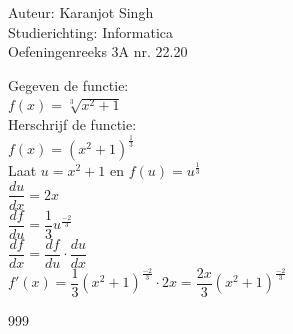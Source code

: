\documentclass[a4paper]{article}
\begin{document}
	
\noindent \large Auteur: Karanjot Singh \\
\noindent \large Studierichting: Informatica \\
\noindent \large Oefeningenreeks 3A nr. 22.20 \\

\normalsize

Gegeven de functie:\\

$f(x) = \sqrt[3]{x^2 + 1}$\\

Herschrijf de functie:\\

$f(x) = (x^2 + 1)^{\tfrac{1}{3}}$\\

Laat $u = x^2 + 1$ en $f(u) = u^{\tfrac{1}{3}}$\\

$\dfrac{du}{dx} = 2x$\\

$\dfrac{df}{du} = \dfrac{1}{3} u^{\tfrac{-2}{3}}$\\

$\dfrac{df}{dx} = \dfrac{df}{du} \cdot \dfrac{du}{dx}$\\

$f'(x) = \dfrac{1}{3} (x^2 + 1)^{\tfrac{-2}{3}} \cdot 2x = \dfrac{2x}{3} (x^2 + 1)^{\tfrac{-2}{3}}$\\

\begin{thebibliography}{999}
\end{thebibliography}
\end{document}
